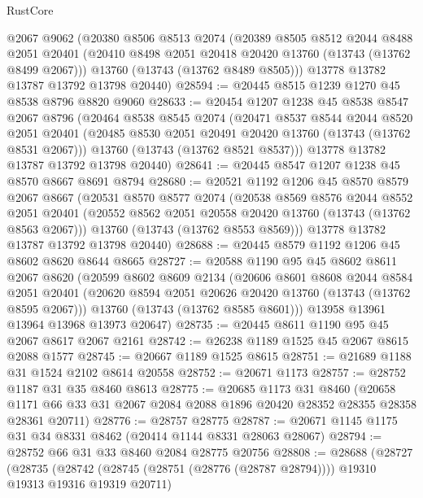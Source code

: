 \begin{lexlean}{RustCore}
\begin{coremodule}
    @2067
    @9062
    (@20380
      @8506
      @8513
      @2074
      (@20389
        @8505
        @8512
        @2044
        @8488
        @2051
        @20401
        (@20410 @8498 @2051 @20418 @20420 @13760 (@13743 (@13762 @8499 @2067)))
        @13760
        (@13743 (@13762 @8489 @8505)))
      @13778
      @13782
      @13787
      @13792
      @13798
      @20440)
@28594 := @20445 @8515 @1239 @1270 @45 @8538 @8796 @8820 @9060
@28633 := @20454
    @1207
    @1238
    @45
    @8538
    @8547
    @2067
    @8796
    (@20464
      @8538
      @8545
      @2074
      (@20471
        @8537
        @8544
        @2044
        @8520
        @2051
        @20401
        (@20485 @8530 @2051 @20491 @20420 @13760 (@13743 (@13762 @8531 @2067)))
        @13760
        (@13743 (@13762 @8521 @8537)))
      @13778
      @13782
      @13787
      @13792
      @13798
      @20440)
@28641 := @20445 @8547 @1207 @1238 @45 @8570 @8667 @8691 @8794
@28680 := @20521
    @1192
    @1206
    @45
    @8570
    @8579
    @2067
    @8667
    (@20531
      @8570
      @8577
      @2074
      (@20538
        @8569
        @8576
        @2044
        @8552
        @2051
        @20401
        (@20552 @8562 @2051 @20558 @20420 @13760 (@13743 (@13762 @8563 @2067)))
        @13760
        (@13743 (@13762 @8553 @8569)))
      @13778
      @13782
      @13787
      @13792
      @13798
      @20440)
@28688 := @20445 @8579 @1192 @1206 @45 @8602 @8620 @8644 @8665
@28727 := @20588
    @1190
    @95
    @45
    @8602
    @8611
    @2067
    @8620
    (@20599
      @8602
      @8609
      @2134
      (@20606
        @8601
        @8608
        @2044
        @8584
        @2051
        @20401
        (@20620 @8594 @2051 @20626 @20420 @13760 (@13743 (@13762 @8595 @2067)))
        @13760
        (@13743 (@13762 @8585 @8601)))
      @13958
      @13961
      @13964
      @13968
      @13973
      @20647)
@28735 := @20445 @8611 @1190 @95 @45 @2067 @8617 @2067 @2161
@28742 := @26238 @1189 @1525 @45 @2067 @8615 @2088 @1577
@28745 := @20667 @1189 @1525 @8615
@28751 := @21689 @1188 @31 @1524 @2102 @8614 @20558
@28752 := @20671 @1173
@28757 := @28752 @1187 @31 @35 @8460 @8613
@28775 := @20685
    @1173
    @31
    @8460
    (@20658 @1171 @66 @33 @31 @2067 @2084 @2088 @1896 @20420 @28352 @28355 @28358 @28361 @20711)
@28776 := @28757 @28775
@28787 := @20671 @1145 @1175 @31 @34 @8331 @8462 (@20414 @1144 @8331 @28063 @28067)
@28794 := @28752 @66 @31 @33 @8460 @2084 @28775 @20756
@28808 := @28688
    (@28727
      (@28735
        (@28742 (@28745 (@28751 (@28776 (@28787 @28794)))) @19310 @19313 @19316 @19319 @20711)

\end{coremodule}
\end{lexlean}
